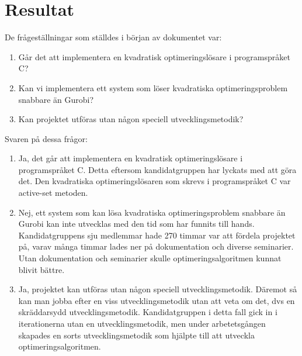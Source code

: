 \section{Resultat}

De frågeställningar som ställdes i början av dokumentet var:
\begin{enumerate}
\item Går det att implementera en kvadratisk optimeringslösare i programspråket C?
\item Kan vi implementera ett system som löser kvadratiska optimeringsproblem snabbare än Gurobi?
\item Kan projektet utföras utan någon speciell utvecklingsmetodik? 
\end{enumerate}

Svaren på dessa frågor:
\begin{enumerate}
\item Ja, det går att implementera en kvadratisk optimeringslösare i programspråket C. Detta eftersom kandidatgruppen har lyckats med att göra det. Den kvadratiska optimeringslösaren som skrevs i programspråket C var active-set metoden. 

\item Nej, ett system som kan lösa kvadratiska optimeringsproblem snabbare än Gurobi kan inte utvecklas med den tid som har funnits till hands. Kandidatgruppens sju medlemmar hade 270 timmar var att fördela projektet på, varav många timmar lades ner på dokumentation och diverse seminarier. Utan dokumentation och seminarier skulle optimeringsalgoritmen kunnat blivit bättre.

\item Ja, projektet kan utföras utan någon speciell utvecklingsmetodik. Däremot så kan man jobba efter en viss utvecklingsmetodik utan att veta om det, dvs en skräddarsydd utvecklingsmetodik. Kandidatgruppen i detta fall gick in i iterationerna utan en utvecklingsmetodik, men under arbetetsgången skapades en sorts utvecklingsmetodik som hjälpte till att utveckla optimeringsalgoritmen.
\end{enumerate}
	
	

